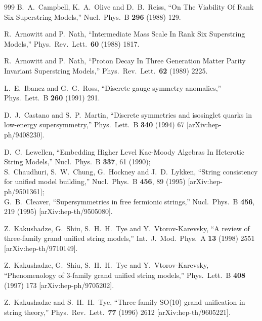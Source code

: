 \begin{thebibliography}{999}
  B.~A.~Campbell, K.~A.~Olive and D.~B.~Reiss,
  ``On The Viability Of Rank Six Superstring Models,''
  Nucl.\ Phys.\ B {\bf 296} (1988) 129.

  R.~Arnowitt and P.~Nath,
  ``Intermediate Mass Scale In Rank Six Superstring Models,''
  Phys.\ Rev.\ Lett.\  {\bf 60} (1988) 1817.

  R.~Arnowitt and P.~Nath,
  ``Proton Decay In Three Generation Matter Parity Invariant Superstring
  Models,''
  Phys.\ Rev.\ Lett.\  {\bf 62} (1989) 2225.

  L.~E.~Ibanez and G.~G.~Ross,
  ``Discrete gauge symmetry anomalies,''
  Phys.\ Lett.\ B {\bf 260} (1991) 291.

  D.~J.~Castano and S.~P.~Martin,
  ``Discrete symmetries and isosinglet quarks in low-energy supersymmetry,''
  Phys.\ Lett.\ B {\bf 340} (1994) 67
  [arXiv:hep-ph/9408230].

  D.~C.~Lewellen,
  ``Embedding Higher Level Kac-Moody Algebras In Heterotic String Models,''
  Nucl.\ Phys.\ B {\bf 337}, 61 (1990);
\\
 S.~Chaudhuri, S.~W.~Chung, G.~Hockney and J.~D.~Lykken,
  ``String consistency for unified model building,''
  Nucl.\ Phys.\ B {\bf 456}, 89 (1995)
  [arXiv:hep-ph/9501361];
\\
 G.~B.~Cleaver,
  ``Supersymmetries in free fermionic strings,''
  Nucl.\ Phys.\ B {\bf 456}, 219 (1995)
  [arXiv:hep-th/9505080].

  Z.~Kakushadze, G.~Shiu, S.~H.~H.~Tye and Y.~Vtorov-Karevsky,
  ``A review of three-family grand unified string models,''
  Int.\ J.\ Mod.\ Phys.\ A {\bf 13} (1998) 2551
  [arXiv:hep-th/9710149].

  Z.~Kakushadze, G.~Shiu, S.~H.~H.~Tye and Y.~Vtorov-Karevsky,
  ``Phenomenology of 3-family grand unified string models,''
  Phys.\ Lett.\ B {\bf 408} (1997) 173
  [arXiv:hep-ph/9705202].

  Z.~Kakushadze and S.~H.~H.~Tye,
  ``Three-family SO(10) grand unification in string theory,''
  Phys.\ Rev.\ Lett.\  {\bf 77} (1996) 2612
  [arXiv:hep-th/9605221].


\end{thebibliography}
